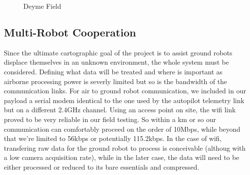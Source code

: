 \documentclass[a4paper,11pt]{report}
\begin{document}
\begin{figure}[ht]
  \centering
  \caption{Deyme Field}
  \label{fig:field_shots}
\end{figure} 

\subsection{Multi-Robot Cooperation}

Since the ultimate cartographic goal of the project is to assist ground robots displace themselves in an unknown environment, the whole system must be considered. Defining what data will be treated and where is important as airborne processing power is severly limited but so is the bandwidth of the communication links. For air to ground robot communication, we included in our payload a serial modem identical to the one used by the autopilot telemetry link but on a different 2.4GHz channel. Using an access point on site, the wifi link proved to be very reliable in our field testing. So within a km or so our communication can comfortably proceed on the order of 10Mbps, while beyond that we're limited to 56kbps or potentially 115.2kbps. In the case of wifi, transfering raw data for the ground robot to process is conceivable (althoug with a low camera acquisition rate), while in the later case, the data will need to be either processed or reduced to its bare essentials and compressed. 
\end{document}
